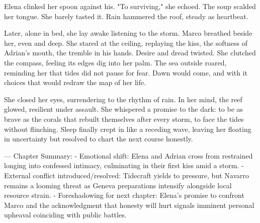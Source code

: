 Elena clinked her spoon against his. "To surviving," she echoed. The soup scalded her tongue. She barely tasted it. Rain hammered the roof, steady as heartbeat.

Later, alone in bed, she lay awake listening to the storm. Marco breathed beside her, even and deep. She stared at the ceiling, replaying the kiss, the softness of Adrian's mouth, the tremble in his hands. Desire and dread twisted. She clutched the compass, feeling its edges dig into her palm. The sea outside roared, reminding her that tides did not pause for fear. Dawn would come, and with it choices that would redraw the map of her life.

She closed her eyes, surrendering to the rhythm of rain. In her mind, the reef glowed, resilient under assault. She whispered a promise to the dark: to be as brave as the corals that rebuilt themselves after every storm, to face the tides without flinching. Sleep finally crept in like a receding wave, leaving her floating in uncertainty but resolved to chart the next course honestly.

\bigskip

---
Chapter Summary:
- Emotional shift: Elena and Adrian cross from restrained longing into confessed intimacy, culminating in their first kiss amid a storm.
- External conflict introduced/resolved: Tidecraft yields to pressure, but Navarro remains a looming threat as Geneva preparations intensify alongside local resource strain.
- Foreshadowing for next chapter: Elena's promise to confront Marco and the acknowledgment that honesty will hurt signals imminent personal upheaval coinciding with public battles.
